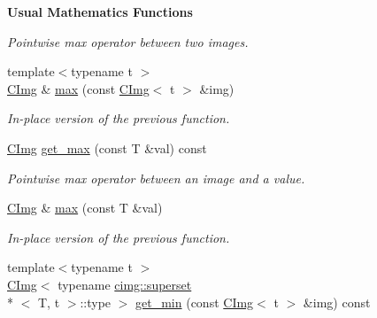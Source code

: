 \begin{Indent}{\bf Usual Mathematics Functions}
\begin{DoxyCompactItemize}
\begin{DoxyCompactList}\small\item\em Pointwise max operator between two images. \end{DoxyCompactList}\item 
\hypertarget{structcimg__library_1_1_c_img_a7720942861de72be96a9f5cea8fc3eb5}{{\footnotesize template$<$typename t $>$ }\\\hyperlink{structcimg__library_1_1_c_img}{C\-Img} \& \hyperlink{structcimg__library_1_1_c_img_a7720942861de72be96a9f5cea8fc3eb5}{max} (const \hyperlink{structcimg__library_1_1_c_img}{C\-Img}$<$ t $>$ \&img)}\label{structcimg__library_1_1_c_img_a7720942861de72be96a9f5cea8fc3eb5}

\begin{DoxyCompactList}\small\item\em In-\/place version of the previous function. \end{DoxyCompactList}\item 
\hypertarget{structcimg__library_1_1_c_img_a1e79da4f5e9530ab639d8991ac264c8e}{\hyperlink{structcimg__library_1_1_c_img}{C\-Img} \hyperlink{structcimg__library_1_1_c_img_a1e79da4f5e9530ab639d8991ac264c8e}{get\-\_\-max} (const T \&val) const }\label{structcimg__library_1_1_c_img_a1e79da4f5e9530ab639d8991ac264c8e}

\begin{DoxyCompactList}\small\item\em Pointwise max operator between an image and a value. \end{DoxyCompactList}\item 
\hypertarget{structcimg__library_1_1_c_img_a9f9c6b0a3ae1299b44f411aa212adf2a}{\hyperlink{structcimg__library_1_1_c_img}{C\-Img} \& \hyperlink{structcimg__library_1_1_c_img_a9f9c6b0a3ae1299b44f411aa212adf2a}{max} (const T \&val)}\label{structcimg__library_1_1_c_img_a9f9c6b0a3ae1299b44f411aa212adf2a}

\begin{DoxyCompactList}\small\item\em In-\/place version of the previous function. \end{DoxyCompactList}\item 
\hypertarget{structcimg__library_1_1_c_img_ab561edb5b711e65c67dc419e9910e106}{{\footnotesize template$<$typename t $>$ }\\\hyperlink{structcimg__library_1_1_c_img}{C\-Img}$<$ typename \hyperlink{structcimg__library_1_1cimg_1_1superset}{cimg\-::superset}\\*
$<$ T, t $>$\-::type $>$ \hyperlink{structcimg__library_1_1_c_img_ab561edb5b711e65c67dc419e9910e106}{get\-\_\-min} (const \hyperlink{structcimg__library_1_1_c_img}{C\-Img}$<$ t $>$ \&img) const }\label{structcimg__library_1_1_c_img_ab561edb5b711e65c67dc419e9910e106}


\end{DoxyCompactItemize}
\end{Indent}
